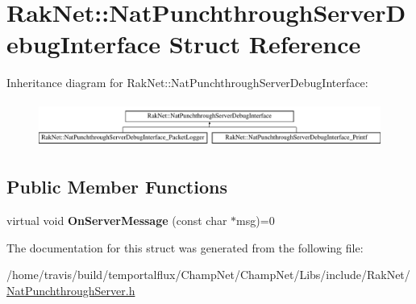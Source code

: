 \hypertarget{struct_rak_net_1_1_nat_punchthrough_server_debug_interface}{\section{Rak\-Net\-:\-:Nat\-Punchthrough\-Server\-Debug\-Interface Struct Reference}
\label{struct_rak_net_1_1_nat_punchthrough_server_debug_interface}
}
Inheritance diagram for Rak\-Net\-:\-:Nat\-Punchthrough\-Server\-Debug\-Interface\-:\begin{figure}[H]
\begin{center}
\leavevmode
\includegraphics[height=1.493333cm]{struct_rak_net_1_1_nat_punchthrough_server_debug_interface}
\end{center}
\end{figure}
\subsection*{Public Member Functions}
\begin{DoxyCompactItemize}
\item 
\hypertarget{struct_rak_net_1_1_nat_punchthrough_server_debug_interface_acdc18a80d0bbddcd2ad22f2938d15eba}{virtual void {\bfseries On\-Server\-Message} (const char $\ast$msg)=0}\label{struct_rak_net_1_1_nat_punchthrough_server_debug_interface_acdc18a80d0bbddcd2ad22f2938d15eba}

\end{DoxyCompactItemize}


The documentation for this struct was generated from the following file\-:\begin{DoxyCompactItemize}
\item 
/home/travis/build/temportalflux/\-Champ\-Net/\-Champ\-Net/\-Libs/include/\-Rak\-Net/\hyperlink{_nat_punchthrough_server_8h}{Nat\-Punchthrough\-Server.\-h}\end{DoxyCompactItemize}

